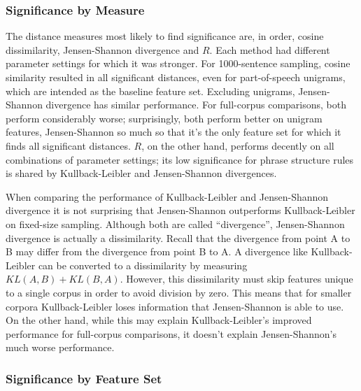 \subsubsection{Significance by Measure}

The distance measures most likely to find significance are, in order,
cosine dissimilarity, Jensen-Shannon divergence and $R$. Each method
had different parameter settings for which it was stronger. For
1000-sentence sampling, cosine similarity resulted in all significant
distances, even for part-of-speech unigrams, which are intended as the
baseline feature set. Excluding unigrams, Jensen-Shannon divergence
has similar performance. For full-corpus comparisons, both perform
considerably worse; surprisingly, both perform better on unigram
features, Jensen-Shannon so much so that it's the only feature set for
which it finds all significant distances. $R$, on the other hand,
performs decently on all combinations of parameter settings; its low
significance for phrase structure rules is shared by Kullback-Leibler
and Jensen-Shannon divergences.

When comparing the performance of Kullback-Leibler and Jensen-Shannon
divergence it is not surprising that Jensen-Shannon outperforms
Kullback-Leibler on fixed-size sampling. Although both are called
``divergence'', Jensen-Shannon divergence is actually a
dissimilarity. Recall that the divergence from point A to B may differ
from the divergence from point B to A. A divergence like
Kullback-Leibler can be converted to a dissimilarity by measuring
$KL(A,B) + KL(B,A)$. However, this dissimilarity must skip features
unique to a single corpus in order to avoid division by zero. This
means that for smaller corpora Kullback-Leibler loses information that
Jensen-Shannon is able to use.  On the other hand, while this may
explain Kullback-Leibler's improved performance for full-corpus
comparisons, it doesn't explain Jensen-Shannon's much worse
performance.

\subsubsection{Significance by Feature Set}



